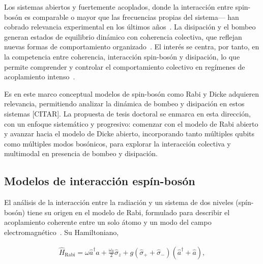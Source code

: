 \documentclass[onecolumn,notitlepage,letterpaper,aps,pra,12pt]{article}
\numberwithin{equation}{section}
\begin{document}
Los sistemas abiertos y fuertemente acoplados, donde la interacción entre spin-bosón es comparable o mayor que las frecuencias propias del sistema— han cobrado relevancia experimental en los últimos años~\cite{Grifoni1999,ZhangHou2015,Burger2022,Fazio2025}. La disipación y el bombeo generan estados de equilibrio dinámico con coherencia colectiva, que reflejan nuevas formas de comportamiento organizado~\cite{Sieberer2016,Halati2020,Chelpanova2025}. El interés se centra, por tanto, en la competencia entre coherencia, interacción spin-bosón y disipación, lo que permite comprender y controlar el comportamiento colectivo en regímenes de acoplamiento intenso~\cite{subasi2012,FornDiaz2019,Kirton2019,LeBoite2020}.

Es en este marco conceptual modelos de spin-bosón como Rabi y Dicke adquieren relevancia, permitiendo analizar la dinámica de bombeo y disipación en estos sistemas [CITAR]. La propuesta de tesis doctoral se enmarca en esta dirección, con un enfoque sistemático y progresivo: comenzar con el modelo de Rabi abierto y avanzar hacia el modelo de Dicke abierto, incorporando tanto múltiples qubits como múltiples modos bosónicos, para explorar la interacción colectiva y multimodal en presencia de bombeo y disipación.




\subsection{Modelos de interacción espín-bosón}

El análisis de la interacción entre la radiación y un sistema de dos niveles (spín-bosón) tiene su origen en el modelo de Rabi, formulado para describir el acoplamiento coherente entre un solo átomo y un modo del campo electromagnético~\cite{rabi1936}. Su Hamiltoniano,

\begin{gather}
    \hat{H}_{\text{Rabi}} = \omega\hat{a}^{\dagger}\hat{a} + \frac{\omega_{0}}{2}\hat{\sigma}_{z} + g\left( \hat{\sigma}_{+} + \hat{\sigma}_{-} \right)\left( \hat{a}^{\dagger} + \hat{a} \right),
\end{gather}
\end{document}
